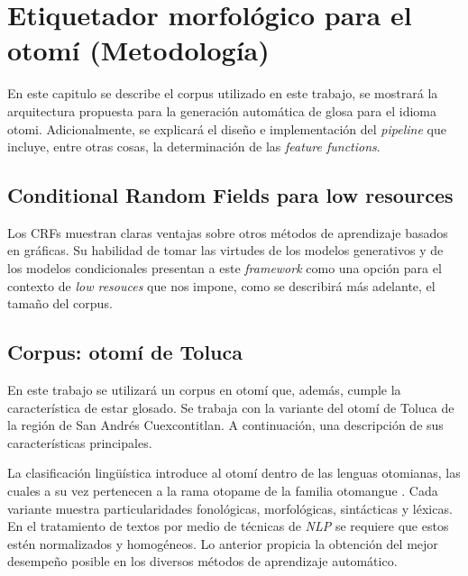 \documentclass[letterpaper,12pt,oneside]{book}
\begin{document}
\chapter{Etiquetador morfológico para el otomí (Metodología)}

En este capitulo se describe el corpus utilizado en este trabajo, se mostrará la arquitectura propuesta para la generación automática de glosa para el idioma otomi. Adicionalmente, se explicará el diseño e implementación del \textit{pipeline} que incluye, entre otras cosas, la determinación de las \textit{feature functions}.


\section{Conditional Random Fields para low resources}

Los CRFs muestran claras ventajas sobre otros métodos de aprendizaje basados en gráficas. Su habilidad de tomar las virtudes de los modelos generativos y de los modelos condicionales presentan a este \textit{framework} como una opción para el contexto de \textit{low resouces} que nos impone, como se describirá más adelante, el tamaño del corpus.
 

\section{Corpus: otomí de Toluca}

En este trabajo se utilizará un corpus en otomí que, además, cumple la característica de estar glosado. Se trabaja con la variante del otomí de Toluca de la región de San Andrés Cuexcontitlan. A continuación, una descripción de sus características principales.

La clasificación lingüística introduce al otomí dentro de las lenguas otomianas, las cuales a su vez pertenecen a la rama otopame de la familia otomangue \citep{barrientos2004otomies}. Cada variante muestra particularidades fonológicas, morfológicas, sintácticas y léxicas. En el tratamiento de textos por medio de técnicas de \textit{NLP} se requiere que estos estén normalizados y homogéneos. Lo anterior propicia la obtención del mejor desempeño posible en los diversos métodos de aprendizaje automático. 
\end{document}
